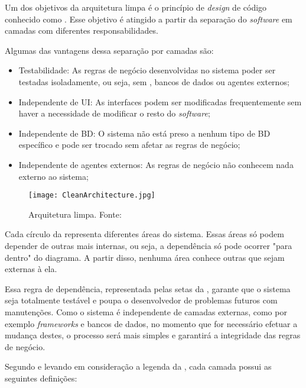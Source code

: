 Um dos objetivos da arquitetura limpa é o princípio de \textit{design} de código conhecido como . Esse objetivo é atingido a partir da separação do \textit{software} em camadas com diferentes responsabilidades.

Algumas das vantagens dessa separação por camadas são:

\begin{itemize}
    \item Testabilidade: As regras de negócio desenvolvidas no sistema poder ser testadas isoladamente, ou seja, sem  , bancos de dados ou agentes externos;
    \item Independente de UI: As interfaces podem ser modificadas frequentemente sem haver a necessidade de modificar o resto do \textit{software};
    \item Independente de BD: O sistema não está preso a nenhum tipo de BD específico e pode ser trocado sem afetar as regras de negócio;
    \item Independente de agentes externos: As regras de negócio não conhecem nada externo ao sistema;
\end{itemize}

\begin{figure}[!htb]
    \centering
    \texttt{[image: CleanArchitecture.jpg]}
    \caption[Arquitetura limpa]{Arquitetura limpa. Fonte: \cite{clean}}
    \label{fig:clean1}
\end{figure}

Cada círculo da  representa diferentes áreas do sistema. Essas áreas só podem depender de outras mais internas, ou seja, a dependência só pode ocorrer "para dentro" do diagrama. A partir disso, nenhuma área conhece outras que sejam externas à ela. 

Essa regra de dependência, representada pelas setas da ,   garante que o sistema seja totalmente testável e poupa o desenvolvedor de problemas futuros com manutenções. Como o sistema é independente de camadas externas, como por exemplo \textit{frameworks} e bancos de dados, no momento que for necessário efetuar a mudança destes, o processo será mais simples e garantirá a integridade das regras de negócio.

Segundo \textcite{clean} e levando em consideração a legenda da , cada camada possui as seguintes definições:

